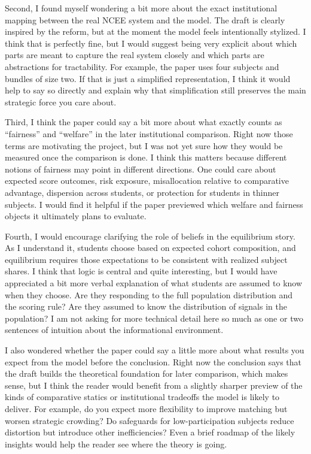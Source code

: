 \documentclass[12pt]{article}
\begin{document}
Second, I found myself wondering a bit more about the exact institutional mapping between the real NCEE system and the model. The draft is clearly inspired by the reform, but at the moment the model feels intentionally stylized. I think that is perfectly fine, but I would suggest being very explicit about which parts are meant to capture the real system closely and which parts are abstractions for tractability. For example, the paper uses four subjects and bundles of size two. If that is just a simplified representation, I think it would help to say so directly and explain why that simplification still preserves the main strategic force you care about.

Third, I think the paper could say a bit more about what exactly counts as ``fairness'' and ``welfare'' in the later institutional comparison. Right now those terms are motivating the project, but I was not yet sure how they would be measured once the comparison is done. I think this matters because different notions of fairness may point in different directions. One could care about expected score outcomes, risk exposure, misallocation relative to comparative advantage, dispersion across students, or protection for students in thinner subjects. I would find it helpful if the paper previewed which welfare and fairness objects it ultimately plans to evaluate.

Fourth, I would encourage clarifying the role of beliefs in the equilibrium story. As I understand it, students choose based on expected cohort composition, and equilibrium requires those expectations to be consistent with realized subject shares. I think that logic is central and quite interesting, but I would have appreciated a bit more verbal explanation of what students are assumed to know when they choose. Are they responding to the full population distribution and the scoring rule? Are they assumed to know the distribution of signals in the population? I am not asking for more technical detail here so much as one or two sentences of intuition about the informational environment.

I also wondered whether the paper could say a little more about what results you expect from the model before the conclusion. Right now the conclusion says that the draft builds the theoretical foundation for later comparison, which makes sense, but I think the reader would benefit from a slightly sharper preview of the kinds of comparative statics or institutional tradeoffs the model is likely to deliver. For example, do you expect more flexibility to improve matching but worsen strategic crowding? Do safeguards for low-participation subjects reduce distortion but introduce other inefficiencies? Even a brief roadmap of the likely insights would help the reader see where the theory is going.
\end{document}
